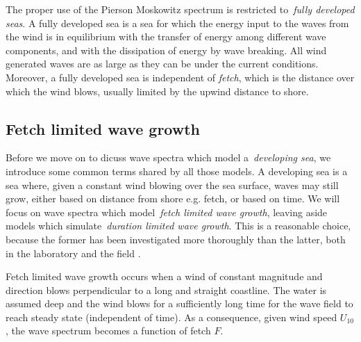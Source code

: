 The proper use of the Pierson Moskowitz spectrum is restricted to~\emph{fully
developed seas}. A fully developed sea is a sea for which the energy input
to the waves from the wind is in equilibrium with the transfer of energy
among different wave components, and with the dissipation of energy by wave 
breaking. All wind generated waves are as large as they can be under the 
current conditions. Moreover, a fully developed sea is independent of 
\emph{fetch}, which is the distance over which the wind blows, usually limited 
by the upwind distance to shore.
%
\subsection{Fetch limited wave growth}
%
Before we move on to dicuss wave spectra which model a~\emph{developing sea}, we 
introduce some common terms shared by all those models. A developing sea is a 
sea where, given a constant wind blowing over the sea surface, waves may still 
grow, either based on distance from shore e.g. fetch, or based on time. We will 
focus on wave spectra which model~\emph{fetch limited wave growth}, leaving 
aside models which simulate~\emph{duration limited wave growth}. This is a 
reasonable choice, because the former has been investigated more thoroughly than
the latter, both in the laboratory and the
field \citep{book:windgeneratedoceanwaves}.

Fetch limited wave growth occurs when a wind of constant magnitude and 
direction blows perpendicular to a long and straight coastline. The water is 
assumed deep and the wind blows for a sufficiently long time for the wave field 
to reach steady state (independent of time). As a consequence, given wind speed 
$U_{10}$, the wave spectrum becomes a function of fetch $F$.

